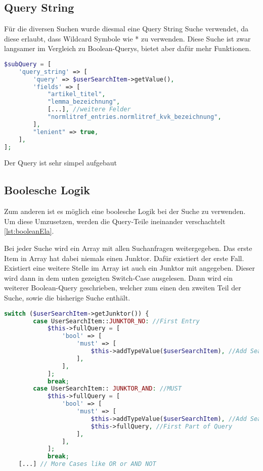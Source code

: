 \subsection{Query String}
Für die diversen Suchen wurde diesmal eine Query String Suche verwendet, da diese erlaubt, dass Wildcard Symbole wie * zu verwenden. Diese Suche ist zwar langsamer im Vergleich zu Boolean-Querys, bietet aber dafür mehr Funktionen.

\begin{lstlisting}[language=PHP, frame=single, label={lst:aufbauQueryString}] 
$subQuery = [
    'query_string' => [
        'query' => $userSearchItem->getValue(),
        'fields' => [
            "artikel_titel",
            "lemma_bezeichnung",
            [...], //weitere Felder
            "normlitref_entries.normlitref_kvk_bezeichnung",
        ],
        "lenient" => true,
    ],
];
\end{lstlisting}

Der Query ist sehr simpel aufgebaut


\subsection{Boolesche Logik}

Zum anderen ist es möglich eine boolesche Logik bei der Suche zu verwenden. Um diese Umzusetzen, werden die Query-Teile ineinander verschachtelt \ref{lst:booleanEla}. 

Bei jeder Suche wird ein Array mit allen Suchanfragen weitergegeben. Das erste Item in Array hat dabei niemals einen Junktor. Dafür existiert der erste Fall. Existiert eine weitere Stelle im Array ist auch ein Junktor mit angegeben. Dieser wird dann in dem unten gezeigten Switch-Case ausgelesen. Dann wird ein weiterer Boolean-Query geschrieben, welcher zum einen den zweiten Teil der Suche, sowie die bisherige Suche enthält.

\begin{lstlisting}[language=PHP, frame=single, label={lst:booleanEla}] 
    switch ($userSearchItem->getJunktor()) {
        case UserSearchItem::JUNKTOR_NO: //First Entry
            $this->fullQuery = [
                'bool' => [
                    'must' => [
                        $this->addTypeValue($userSearchItem), //Add Search
                    ],
                ],
            ];
            break;
        case UserSearchItem:: JUNKTOR_AND: //MUST
            $this->fullQuery = [
                'bool' => [
                    'must' => [
                        $this->addTypeValue($userSearchItem), //Add Search
                        $this->fullQuery, //First Part of Query
                    ],
                ],
            ];
            break;
    [...] // More Cases like OR or AND NOT
\end{lstlisting}

